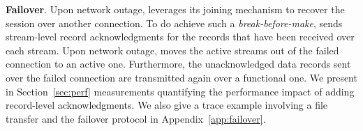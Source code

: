 \textbf{Failover}. 
Upon network outage, \tcpls leverages its joining mechanism to recover the session
over another \tcp connection. To do achieve such a \emph{break-before-make}, \tcpls sends stream-level record
acknowledgments for the records that have been received
over each stream. Upon network outage, \tcpls moves the
active streams out of the failed \tcp connection to an active one. Furthermore,
the unacknowledged data records sent over the failed \tcp connection are
transmitted again over a functional one.
We present in Section~\ref{sec:perf} measurements quantifying the
performance impact of adding \tcpls record-level acknowledgments. We also give a
trace example involving a file transfer and the failover protocol in
Appendix~\ref{app:failover}.

